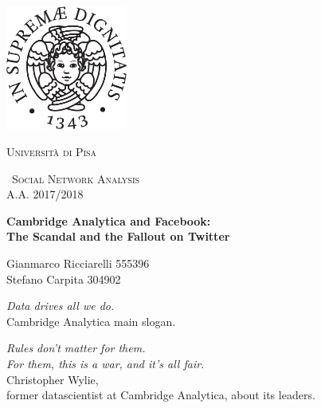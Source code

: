 \begin{titlepage}
    \centering
    \includegraphics[width=0.30\textwidth]{images/cherubino_black.pdf}\par\vspace{1cm}
    {\scshape\LARGE Università di Pisa \par}
    \vspace{1cm}
    {\scshape\ Social Network Analysis \\A.A. 2017/2018\par}
    \vspace{1.5cm}
    {\huge\bfseries Cambridge Analytica and Facebook: \\ The Scandal and the Fallout on Twitter\\ \par}
    \vspace{2cm}
    {\Large Gianmarco Ricciarelli 555396 \\ Stefano Carpita 304902 \par}
    \vfill

\begin{flushright}    
  \textit{Data drives all we do.}\\
\vspace{2 mm}
Cambridge Analytica main slogan.
\end{flushright}

\vspace{4 mm}
    
\begin{flushright}    
  \textit{Rules don’t matter for them. \\ For them, this is a war, and it’s all fair.}\\
\vspace{2 mm}
  Christopher Wylie, \\ former datascientist at Cambridge Analytica, about its leaders.
\end{flushright}




  \end{titlepage}

